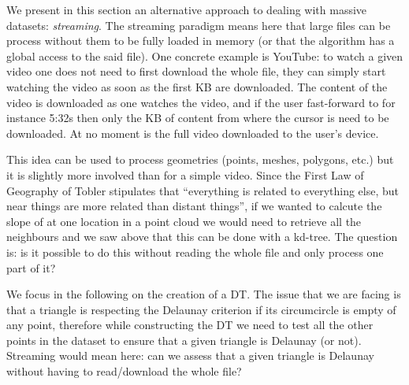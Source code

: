 %

We present in this section an alternative approach to dealing with massive datasets: \emph{streaming}.%
The streaming paradigm means here that large files can be process without them to be fully loaded in memory (or that the algorithm has a global access to the said file).
One concrete example is YouTube: to watch a given video one does not need to first download the whole file, they can simply start watching the video as soon as the first KB are downloaded.
The content of the video is downloaded as one watches the video, and if the user fast-forward to for instance 5:32s then only the KB of content from where the cursor is need to be downloaded.
At no moment is the full video downloaded to the user's device.

%

This idea can be used to process geometries (points, meshes, polygons, etc.) but it is slightly more involved than for a simple video.
Since the First Law of Geography of Tobler stipulates that ``everything is related to everything else, but near things are more related than distant things'', if we wanted to calcute the slope of at one location in a point cloud we would need to retrieve all the neighbours and we saw above that this can be done with a kd-tree.
The question is: is it possible to do this without reading the whole file and only process one part of it?

%

We focus in the following on the creation of a DT\@.
The issue that we are facing is that a triangle is respecting the Delaunay criterion if its circumcircle is empty of any point, therefore while constructing the DT we need to test all the other points in the dataset to ensure that a given triangle is Delaunay (or not).
Streaming would mean here: can we assess that a given triangle is Delaunay without having to read/download the whole file?


